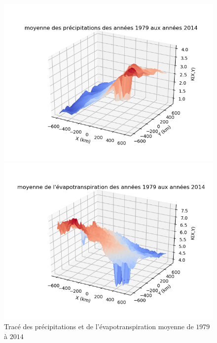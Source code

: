 \documentclass[a4paper,11pt]{article}
\begin{document}
\begin{figure}[h]
	\begin{center}
	\begin{minipage}[b]{0.48\linewidth}
		\centering \includegraphics[scale=0.5]{images/mean_precip.png}
	\end{minipage}\hfill
	\begin{minipage}[b]{0.48\linewidth}	
		\centering \includegraphics[scale=0.5]{images/mean_evap.png}
	\end{minipage}
	\end{center}
	\caption{Tracé des précipitations et de l'évapotranspiration moyenne de $1979$ à $2014$}
\end{figure} 
\end{document}
